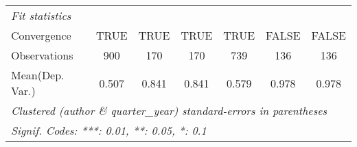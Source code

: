 \begin{tabular}{lcccccc}
   \midrule
   \emph{Fit statistics}\\
   Convergence             &TRUE         & TRUE       & TRUE       & TRUE    & FALSE  & FALSE\\  
   Observations            & 900         & 170        & 170        & 739     & 136    & 136\\  
Mean(Dep. Var.) & 0.507 & 0.841 & 0.841 & 0.579 & 0.978 & 0.978 \\
   \midrule \midrule
   \multicolumn{7}{l}{\emph{Clustered (author \& quarter\_year) standard-errors in parentheses}}\\
   \multicolumn{7}{l}{\emph{Signif. Codes: ***: 0.01, **: 0.05, *: 0.1}}\\
\end{tabular}
\par\endgroup
